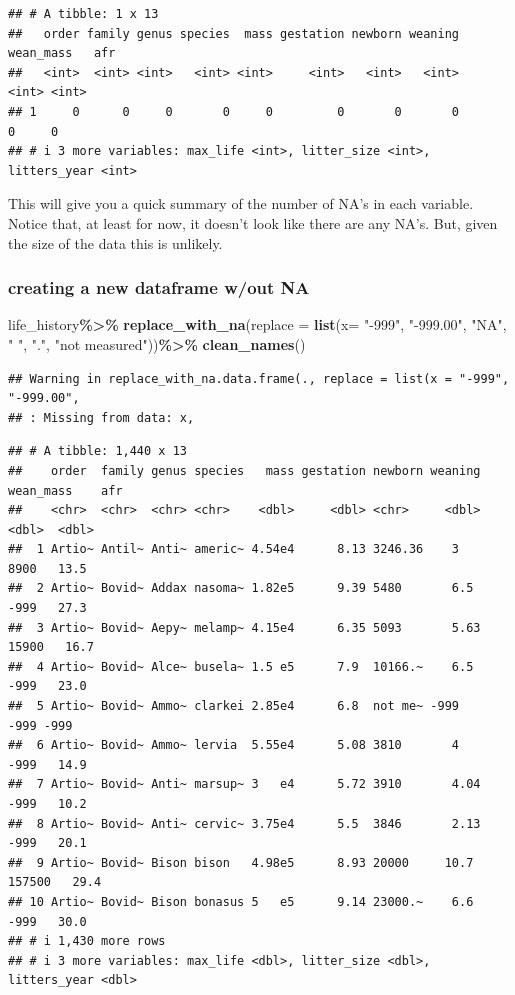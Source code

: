 \documentclass[
]{article}
\newenvironment{Shaded}{\begin{snugshade}}{\end{snugshade}}
\newcommand{\AttributeTok}[1]{\textcolor[rgb]{0.13,0.29,0.53}{#1}}
\newcommand{\FunctionTok}[1]{\textcolor[rgb]{0.13,0.29,0.53}{\textbf{#1}}}
\newcommand{\NormalTok}[1]{#1}
\newcommand{\SpecialCharTok}[1]{\textcolor[rgb]{0.81,0.36,0.00}{\textbf{#1}}}
\newcommand{\StringTok}[1]{\textcolor[rgb]{0.31,0.60,0.02}{#1}}
\begin{document}
\begin{verbatim}
## # A tibble: 1 x 13
##   order family genus species  mass gestation newborn weaning wean_mass   afr
##   <int>  <int> <int>   <int> <int>     <int>   <int>   <int>     <int> <int>
## 1     0      0     0       0     0         0       0       0         0     0
## # i 3 more variables: max_life <int>, litter_size <int>, litters_year <int>
\end{verbatim}

This will give you a quick summary of the number of NA's in each
variable. Notice that, at least for now, it doesn't look like there are
any NA's. But, given the size of the data this is unlikely.

\hypertarget{creating-a-new-dataframe-wout-na}{%
\subsubsection{creating a new dataframe w/out
NA}\label{creating-a-new-dataframe-wout-na}}

\begin{Shaded}
\begin{Highlighting}[]
\NormalTok{life\_history}\SpecialCharTok{\%\textgreater{}\%}
  \FunctionTok{replace\_with\_na}\NormalTok{(}\AttributeTok{replace =} \FunctionTok{list}\NormalTok{(}\AttributeTok{x=} \StringTok{"{-}999"}\NormalTok{, }\StringTok{"{-}999.00"}\NormalTok{, }\StringTok{"NA"}\NormalTok{, }\StringTok{" "}\NormalTok{, }\StringTok{"."}\NormalTok{, }\StringTok{"not measured"}\NormalTok{))}\SpecialCharTok{\%\textgreater{}\%}
  \FunctionTok{clean\_names}\NormalTok{()}
\end{Highlighting}
\end{Shaded}

\begin{verbatim}
## Warning in replace_with_na.data.frame(., replace = list(x = "-999", "-999.00",
## : Missing from data: x,
\end{verbatim}

\begin{verbatim}
## # A tibble: 1,440 x 13
##    order  family genus species   mass gestation newborn weaning wean_mass    afr
##    <chr>  <chr>  <chr> <chr>    <dbl>     <dbl> <chr>     <dbl>     <dbl>  <dbl>
##  1 Artio~ Antil~ Anti~ americ~ 4.54e4      8.13 3246.36    3         8900   13.5
##  2 Artio~ Bovid~ Addax nasoma~ 1.82e5      9.39 5480       6.5       -999   27.3
##  3 Artio~ Bovid~ Aepy~ melamp~ 4.15e4      6.35 5093       5.63     15900   16.7
##  4 Artio~ Bovid~ Alce~ busela~ 1.5 e5      7.9  10166.~    6.5       -999   23.0
##  5 Artio~ Bovid~ Ammo~ clarkei 2.85e4      6.8  not me~ -999         -999 -999  
##  6 Artio~ Bovid~ Ammo~ lervia  5.55e4      5.08 3810       4         -999   14.9
##  7 Artio~ Bovid~ Anti~ marsup~ 3   e4      5.72 3910       4.04      -999   10.2
##  8 Artio~ Bovid~ Anti~ cervic~ 3.75e4      5.5  3846       2.13      -999   20.1
##  9 Artio~ Bovid~ Bison bison   4.98e5      8.93 20000     10.7     157500   29.4
## 10 Artio~ Bovid~ Bison bonasus 5   e5      9.14 23000.~    6.6       -999   30.0
## # i 1,430 more rows
## # i 3 more variables: max_life <dbl>, litter_size <dbl>, litters_year <dbl>
\end{verbatim}
\end{document}
